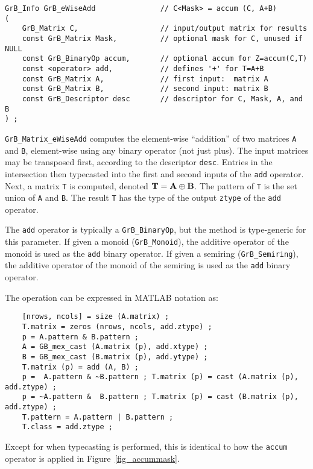 \documentclass[12pt]{article}
\begin{document}
\begin{mdframed}[userdefinedwidth=6in]
{\footnotesize
\begin{verbatim}
GrB_Info GrB_eWiseAdd               // C<Mask> = accum (C, A+B)
(
    GrB_Matrix C,                   // input/output matrix for results
    const GrB_Matrix Mask,          // optional mask for C, unused if NULL
    const GrB_BinaryOp accum,       // optional accum for Z=accum(C,T)
    const <operator> add,           // defines '+' for T=A+B
    const GrB_Matrix A,             // first input:  matrix A
    const GrB_Matrix B,             // second input: matrix B
    const GrB_Descriptor desc       // descriptor for C, Mask, A, and B
) ;
\end{verbatim} } \end{mdframed}

\verb'GrB_Matrix_eWiseAdd' computes the element-wise ``addition'' of two
matrices \verb'A' and \verb'B', element-wise using any binary operator (not
just plus).  The input matrices may be transposed first, according to the
descriptor \verb'desc'.  Entries in the intersection then typecasted into the
first and second inputs of the \verb'add' operator.  Next, a matrix \verb'T' is
computed, denoted ${\bf T = A \oplus B}$.  The pattern of \verb'T' is the set
union of \verb'A' and \verb'B'.  The result \verb'T' has the type of the output
\verb'ztype' of the \verb'add' operator.

The \verb'add' operator is typically a \verb'GrB_BinaryOp', but the method is
type-generic for this parameter.  If given a monoid (\verb'GrB_Monoid'), the
additive operator of the monoid is used as the \verb'add' binary operator.  If
given a semiring (\verb'GrB_Semiring'), the additive operator of the monoid of
the semiring is used as the \verb'add' binary operator.

\vspace{0.05in}
The operation can be expressed in MATLAB notation as:
    {\footnotesize
    \begin{verbatim}
    [nrows, ncols] = size (A.matrix) ;
    T.matrix = zeros (nrows, ncols, add.ztype) ;
    p = A.pattern & B.pattern ;
    A = GB_mex_cast (A.matrix (p), add.xtype) ;
    B = GB_mex_cast (B.matrix (p), add.ytype) ;
    T.matrix (p) = add (A, B) ;
    p =  A.pattern & ~B.pattern ; T.matrix (p) = cast (A.matrix (p), add.ztype) ;
    p = ~A.pattern &  B.pattern ; T.matrix (p) = cast (B.matrix (p), add.ztype) ;
    T.pattern = A.pattern | B.pattern ;
    T.class = add.ztype ; \end{verbatim} }
Except for when typecasting is performed, this is identical to how the
\verb'accum' operator is applied in Figure~\ref{fig_accummask}.
\end{document}
